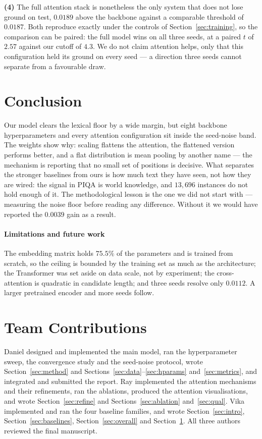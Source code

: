 \documentclass[11pt]{article}
\begin{document}
\textbf{(4)} The full attention stack is nonetheless the only system that does
not lose ground on test, $0.0189$ above the backbone against a comparable
threshold of $0.0187$. Both reproduce exactly under the controls of
Section~\ref{sec:training}, so the comparison can be paired: the full model
wins on all three seeds, at a paired $t$ of $2.57$ against our cutoff of
$4.3$. We do not claim attention helps, only that this configuration held its
ground on every seed --- a direction three seeds cannot separate from a
favourable draw.

\section{Conclusion}
\label{sec:conclusion}

Our model clears the lexical floor by a wide margin, but eight backbone
hyperparameters and every attention configuration sit inside the seed-noise
band. The weights show why: scaling flattens the attention, the flattened
version performs better, and a flat distribution is mean pooling by another
name --- the mechanism is reporting that no small set of positions is
decisive. What separates the stronger baselines from ours is how much text
they have seen, not how they are wired: the signal in PIQA is world knowledge,
and $13{,}696$ instances do not hold enough of it. The methodological lesson
is the one we did not start with --- measuring the noise floor before reading
any difference. Without it we would have reported the $0.0039$ gain as a
result.

\paragraph{Limitations and future work}
The embedding matrix holds $75.5\%$ of the parameters and is trained from
scratch, so the ceiling is bounded by the training set as much as the
architecture; the Transformer was set aside on data scale, not by experiment;
the cross-attention is quadratic in candidate length; and three seeds resolve
only $0.0112$. A larger pretrained encoder and more seeds follow.

\clearpage
\section*{Team Contributions}

Daniel designed and implemented the main model, ran the hyperparameter sweep,
the convergence study and the seed-noise protocol, wrote Section~\ref{sec:method}
and Sections~\ref{sec:data}--\ref{sec:hparams} and~\ref{sec:metrics}, and
integrated and submitted the report. Ray implemented the attention mechanisms
and their refinements, ran the ablations, produced the attention
visualisations, and wrote Section~\ref{sec:refine} and
Sections~\ref{sec:ablation} and~\ref{sec:qual}. Vika implemented and ran the
four baseline families, and wrote Section~\ref{sec:intro},
Section~\ref{sec:baselines}, Section~\ref{sec:overall} and
Section~\ref{sec:conclusion}. All three authors reviewed the final manuscript.


\end{document}

